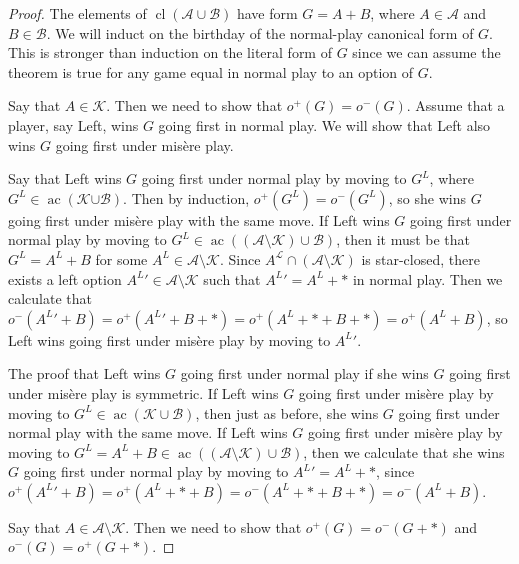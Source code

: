 \documentclass{amsart}
\theoremstyle{plain}
\theoremstyle{definition}
\theoremstyle{remark}
\numberwithin{equation}{section}
\numberwithin{thm}{section}
\DeclareMathOperator{\cl}{cl}
\DeclareMathOperator{\ac}{ac}
\begin{document}
\begin{proof}
    The elements of $\cl(\mathscr{A} \cup \mathscr{B})$ have form $G= A+B$, where $A \in \mathscr{A}$ and $B \in \mathscr{B}$. We will induct on the birthday of the normal-play canonical form of $G$. This is stronger than induction on the literal form of $G$ since we can assume the theorem is true for any game equal in normal play to an option of $G$.

    Say that $A \in \mathscr{K}$. Then we need to show that $o^+(G) = o^-(G)$. Assume that a player, say Left, wins $G$ going first in normal play. We will show that Left also wins $G$ going first under mis\`ere play.

Say that Left wins $G$ going first under normal play by moving to $G^L$, where $G^L \in \ac(\mathscr{K{ \cup \mathscr{B}}})$. Then by induction, $o^+(G^L) = o^-(G^L)$, so she wins $G$ going first under mis\`ere play with the same move. If Left wins $G$ going first under normal play by moving to $G^L \in \ac( (\mathscr{A}\setminus \mathscr{K} )\cup \mathscr{B})$, then it must be that $G^L = A^L+B$ for some $A^L \in \mathscr{A}\setminus \mathscr{K} $. Since $A^{\mathcal{L}} \cap (\mathscr{A} \setminus \mathscr{K})$ is star-closed, there exists a left option ${A^L}' \in \mathscr{A}\setminus\mathscr{K} $ such that ${A^L}' = A^L+*$ in normal play. Then we calculate that $o^-({A^L}' +B) = o^+({A^L}' + B + *) =o^+(A^L+*+B+*) = o^+(A^L+B)$, so Left wins going first under mis\`ere play by moving to ${A^L}'$.

The proof that Left wins $G$ going first under normal play if she wins $G$ going first under mis\`ere play is symmetric. If Left wins $G$ going first under mis\`ere play by moving to $G^L \in\ac(  \mathscr{K} \cup \mathscr{B})$, then just as before,  she wins $G$ going first under normal play with the same move. If Left wins $G$ going first under mis\`ere play by moving to $G^L  = A^L + B \in \ac( (\mathscr{A}\setminus \mathscr{K} )\cup \mathscr{B})$, then we calculate that she wins $G$ going first under normal play by moving to ${A^L}' = A^L +*$, since $o^+({A^L}' +B) = o^+(A^L+*+B) = o^-(A^L+*+B+*) = o^-(A^L+B)$. 

    Say that $A \in \mathscr{A} \setminus \mathscr{K}$. Then we need to show that $o^+(G) = o^-(G+*)$ and $o^-(G) = o^+(G+*)$. 


\end{proof}
\end{document}
